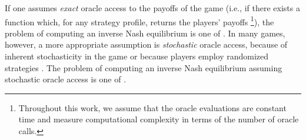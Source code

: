 
If one assumes \emph{exact\/} oracle access to the payoffs of the game (i.e., if there exists a function which, for any strategy profile, returns the players' payoffs%
\footnote{Throughout this work, we assume that the oracle evaluations are constant time and measure computational complexity in terms of the number of oracle calls.}),
the problem of computing an inverse Nash equilibrium is one of . 
In many games, however, a more appropriate assumption is \emph{stochastic\/} oracle access, because of inherent stochasticity in the game \citep{shapley1953stochastic} or because players employ randomized 
strategies \cite{nash1950existence}.
The problem of computing an inverse Nash equilibrium assuming stochastic oracle access is one of .



